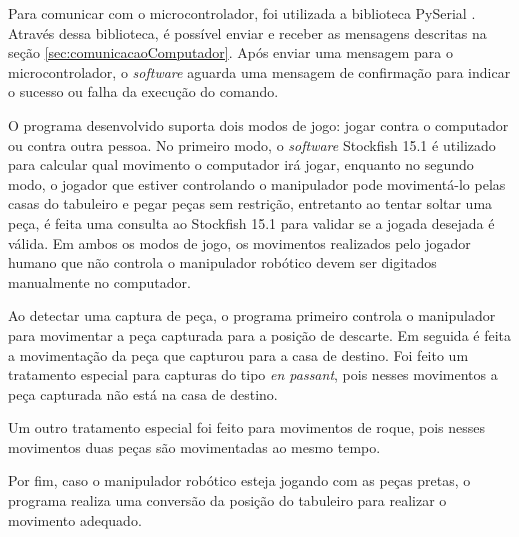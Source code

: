 Para comunicar com o microcontrolador, foi utilizada a biblioteca PySerial \cite{pyserial}.
Através dessa biblioteca, é possível enviar e receber as mensagens descritas na seção \ref{sec:comunicacaoComputador}.
Após enviar uma mensagem para o microcontrolador, o \textit{software} aguarda uma mensagem de confirmação para indicar o sucesso ou falha da execução do comando.

O programa desenvolvido suporta dois modos de jogo: jogar contra o computador ou contra outra pessoa.
No primeiro modo, o \textit{software} Stockfish 15.1 é utilizado para calcular qual movimento o computador irá jogar, 
enquanto no segundo modo, o jogador que estiver controlando o manipulador pode movimentá-lo pelas casas do tabuleiro e pegar peças sem restrição, entretanto ao tentar soltar uma peça, é feita uma consulta ao Stockfish 15.1 para validar se a jogada desejada é válida.
Em ambos os modos de jogo, os movimentos realizados pelo jogador humano que não controla o manipulador robótico devem ser digitados manualmente no computador.

Ao detectar uma captura de peça, o programa primeiro controla o manipulador para movimentar a peça capturada para a posição de descarte.
Em seguida é feita a movimentação da peça que capturou para a casa de destino.
Foi feito um tratamento especial para capturas do tipo \textit{en passant}, pois nesses movimentos a peça capturada não está na casa de destino.

Um outro tratamento especial foi feito para movimentos de roque, pois nesses movimentos duas peças são movimentadas ao mesmo tempo.

Por fim, caso o manipulador robótico esteja jogando com as peças pretas,
o programa realiza uma conversão da posição do tabuleiro para realizar o movimento adequado.
